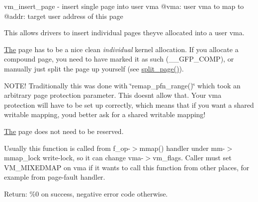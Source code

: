 vm\+\_\+insert\+\_\+page -\/ insert single page into user vma @vma\+: user vma to map to @addr\+: target user address of this page

This allows drivers to insert individual pages they\textquotesingle{}ve allocated into a user vma.

\mbox{\hyperlink{classThe}{The}} page has to be a nice clean {\itshape individual} kernel allocation. If you allocate a compound page, you need to have marked it as such (\+\_\+\+\_\+\+G\+F\+P\+\_\+\+C\+O\+MP), or manually just split the page up yourself (see \mbox{\hyperlink{page__alloc_8c_abd23d9d1d47d00b0433cad037f8d4972}{split\+\_\+page()}}).

N\+O\+T\+E! Traditionally this was done with \char`\"{}remap\+\_\+pfn\+\_\+range()\char`\"{} which took an arbitrary page protection parameter. This doesn\textquotesingle{}t allow that. Your vma protection will have to be set up correctly, which means that if you want a shared writable mapping, you\textquotesingle{}d better ask for a shared writable mapping!

\mbox{\hyperlink{classThe}{The}} page does not need to be reserved.

Usually this function is called from f\+\_\+op-\/$>$mmap() handler under mm-\/$>$mmap\+\_\+lock write-\/lock, so it can change vma-\/$>$vm\+\_\+flags. Caller must set V\+M\+\_\+\+M\+I\+X\+E\+D\+M\+AP on vma if it wants to call this function from other places, for example from page-\/fault handler.

Return\+: \%0 on success, negative error code otherwise. 